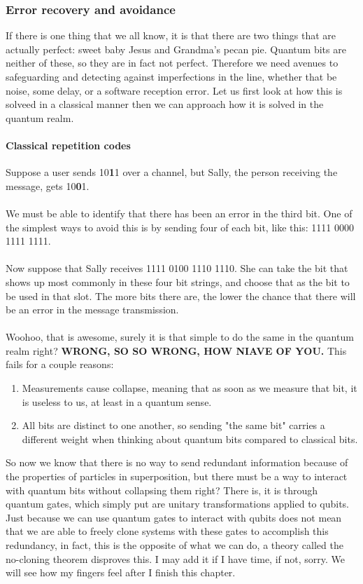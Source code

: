 \documentclass[12pt]{article}
\theoremstyle{plain}
\theoremstyle{nonumberplain}
\theoremstyle{plain}
\theoremstyle{nonumberplain}
\newcommand\1{{\bf 1}}
\newcommand{\<}{\left\langle}
\renewcommand{\>}{\right\rangle}
\begin{document}
\pagebreak

\subsubsection{Error recovery and avoidance}
If there is one thing that we all know, it is that there are two things that are actually perfect: sweet baby Jesus and Grandma's pecan pie.  Quantum bits are neither of these, so they are in fact not perfect.  Therefore we need avenues to safeguarding and detecting against imperfections in the line, whether that be noise, some delay, or a software reception error.  Let us first look at how this is solveed in a classical manner then we can approach how it is solved in the quantum realm.  

\paragraph{Classical repetition codes}
Suppose a user sends 10\textbf{1}1 over a channel, but Sally, the person receiving the message, gets 10\textbf{0}1.  \\
\\
We must be able to identify that there has been an error in the third bit.  One of the simplest ways to avoid this is by sending four of each bit, like this: 1111 0000 1111 1111.  \\
\\
Now suppose that Sally receives 1111 0100 1110 1110.  She can take the bit that shows up most commonly in these four bit strings, and choose that as the bit to be used in that slot.  The more bits there are, the lower the chance that there will be an error in the message transmission.\\
\\
Woohoo, that is awesome, surely it is that simple to do the same in the quantum realm right?  \textbf{WRONG, SO SO WRONG, HOW NIAVE OF YOU.}  This fails for a couple reasons: 
\begin{enumerate}
\item Measurements cause collapse, meaning that as soon as we measure that bit, it is useless to us, at least in a quantum sense. 
\item All bits are distinct to one another, so sending "the same bit" carries a different weight when thinking about quantum bits compared to classical bits.
\end{enumerate}
So now we know that there is no way to send redundant information because of the properties of particles in superposition, but there must be a way to interact with quantum bits without collapsing them right? There is, it is through quantum gates, which simply put are unitary transformations applied to qubits.  Just because we can use quantum gates to interact with qubits does not mean that we are able to freely clone systems with these gates to accomplish this redundancy, in fact, this is the opposite of what we can do, a theory called the no-cloning theorem disproves this.  I may add it if I have time, if not, sorry.  We will see how my fingers feel after I finish this chapter.
\end{document}
